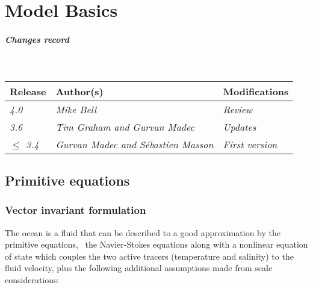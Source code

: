 \documentclass[../main/NEMO_manual]{subfiles}
\begin{document}
\chapter{Model Basics}
\label{chap:MB}

\thispagestyle{plain}

\chaptertoc

\paragraph{Changes record} ~\\

{\footnotesize
  \begin{tabular}{l||l|l}
    Release          & Author(s)                                   & Modifications       \\
    \hline
    {\em        4.0} & {\em Mike Bell                            } & {\em Review       } \\
    {\em        3.6} & {\em Tim Graham and Gurvan Madec          } & {\em Updates      } \\
    {\em $\leq$ 3.4} & {\em Gurvan Madec and S\'{e}bastien Masson} & {\em First version} \\
  \end{tabular}
}

\clearpage

\section{Primitive equations}
\label{sec:MB_PE}

\subsection{Vector invariant formulation}
\label{subsec:MB_PE_vector}

The ocean is a fluid that can be described to a good approximation by the primitive equations,
\ie\ the Navier-Stokes equations along with a nonlinear equation of state which
couples the two active tracers (temperature and salinity) to the fluid velocity,
plus the following additional assumptions made from scale considerations:
\end{document}
